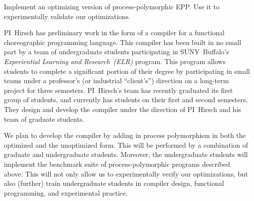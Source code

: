 \begin{goal}
  Implement an optimizing version of process-polymorphic EPP.
  Use it to experimentally validate our optimizations.
\end{goal}

PI~Hirsch has preliminary work in the form of a compiler for a functional choreographic programming language.
This compiler has been built in no small part by a team of undergraduate students participating in SUNY~Buffalo's \emph{Experiential Learning and Research~(ELR)} program.
This program allows students to complete a significant portion of their degree by participating in small teams under a professor's (or industrial ``client's'') direction on a long-term project for three semesters.
PI~Hirsch's team has recently graduated its first group of students, and currently has students on their first and second semesters.
They design and develop the compiler under the direction of PI~Hirsch and his team of graduate students.

We plan to develop the compiler by adding in process polymorphism in both the optimized and the unoptimized form.
This will be performed by a combination of graduate and undergraduate students.
Moreover, the undergraduate students will implement the benchmark suite of process-polymorphic programs described above.
This will not only allow us to experimentally verify our optimizations, but also (further) train undergraduate students in compiler design, functional programming, and experimental practice.


